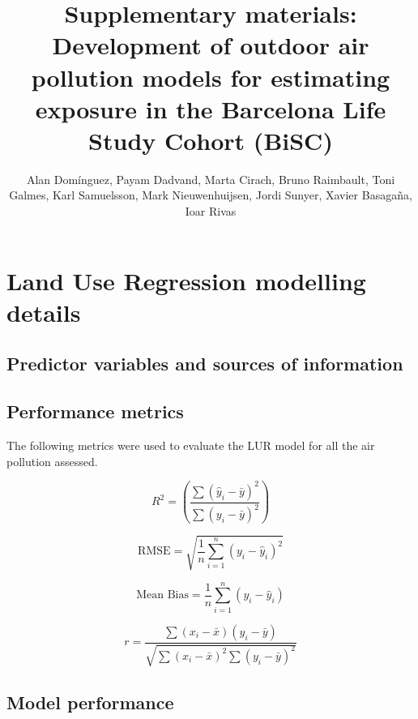 \documentclass{article}
\title{\textbf{Supplementary materials: Development of outdoor air pollution models for estimating exposure in the Barcelona Life Study Cohort (BiSC)}}
\author{Alan Domínguez, Payam Dadvand, Marta Cirach, Bruno Raimbault, Toni Galmes, Karl Samuelsson, Mark Nieuwenhuijsen, Jordi Sunyer, Xavier Basagaña, Ioar Rivas}
\begin{document}
\maketitle

\section{Land Use Regression modelling details}

\subsection{Predictor variables and sources of information}

\subsection{Performance metrics}
The following metrics were used to evaluate the LUR model for all the air pollution assessed. 



\begin{equation}
R^2 = \left( \frac{\sum (\hat{y}_i - \bar{y})^2}{\sum (y_i - \bar{y})^2} \right)
\end{equation}

\begin{equation}
\text{RMSE} = \sqrt{\frac{1}{n} \sum_{i=1}^{n} (y_i - \hat{y}_i)^2}
\end{equation}

\begin{equation}
\text{Mean Bias} = \frac{1}{n} \sum_{i=1}^{n} (y_i - \hat{y}_i)
\end{equation}

\begin{equation}
r = \frac{\sum (x_i - \bar{x})(y_i - \bar{y})}{\sqrt{\sum (x_i - \bar{x})^2 \sum (y_i - \bar{y})^2}}
\end{equation}
\vspace{0.5 cm}


\subsection{Model performance}
\end{document}
